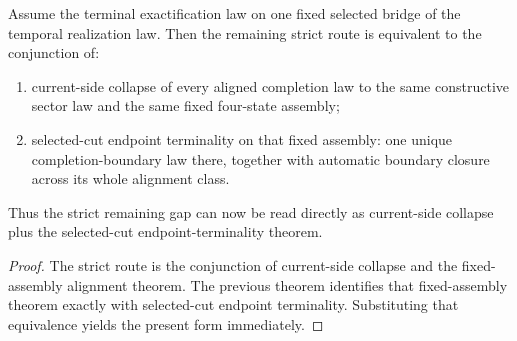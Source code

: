 \begin{theorem}
\label{thm:canonical-law-native-alignment-boundary-route-target-iff-canonical-law-native-completion-collapse-target-and-canonical-completion-boundary-law-fill-target}
Assume the terminal exactification law on one fixed selected bridge of the
temporal realization law. Then the remaining strict route is equivalent to the
conjunction of:
\begin{enumerate}
\item current-side collapse of every aligned completion law to the same
constructive sector law and the same fixed four-state assembly;
\item selected-cut endpoint terminality on that fixed assembly: one unique
completion-boundary law there, together with automatic boundary closure across
its whole alignment class.
\end{enumerate}
Thus the strict remaining gap can now be read directly as current-side collapse
plus the selected-cut endpoint-terminality theorem.
\end{theorem}

\begin{proof}
The strict route is the conjunction of current-side collapse and the
fixed-assembly alignment theorem. The previous theorem identifies that
fixed-assembly theorem exactly with selected-cut endpoint terminality.
Substituting that equivalence yields the present form immediately.
\end{proof}

